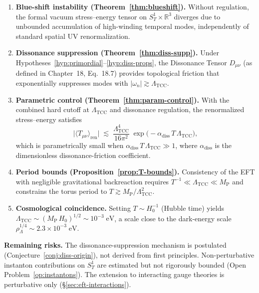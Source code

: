 \documentclass[12pt,openany]{book}
\theoremstyle{plain}
\theoremstyle{definition}
\theoremstyle{remark}
\providecommand{\Ltcc}{\Lambda_{\mathrm{TCC}}}
\providecommand{\Mpl}{M_{\mathrm{P}}}
\providecommand{\vev}[1]{\langle #1 \rangle}
\providecommand{\abs}[1]{\lvert #1 \rvert}
\providecommand{\Ren}{\mathrm{ren}}
\providecommand{\diss}{\mathrm{diss}}
\providecommand{\SoneR}{S^{1}_{T}\!\times\!\mathbb{R}^{3}}
\begin{document}
\begin{enumerate}
  \item \textbf{Blue-shift instability (Theorem~\ref{thm:blueshift}).}
    Without regulation, the formal vacuum stress--energy tensor on
    $\SoneR$ diverges due to unbounded accumulation of
    high-winding temporal modes, independently of standard spatial UV
    renormalization.

  \item \textbf{Dissonance suppression (Theorem~\ref{thm:diss-supp}).}
    Under Hypotheses~\ref{hyp:primordial}--\ref{hyp:diss-props},
    the Dissonance Tensor $D_{\mu\nu}$ (as defined in Chapter~18,
    Eq.~18.7) provides topological friction that exponentially suppresses
    modes with $\abs{\omega_n} \gtrsim \Ltcc$.

  \item \textbf{Parametric control (Theorem~\ref{thm:param-control}).}
    With the combined hard cutoff at $\Ltcc$ and dissonance regulation,
    the renormalized stress--energy satisfies
    \[
      \abs{\vev{T_{\mu\nu}}_{\Ren}} \;\lesssim\;
        \frac{\Ltcc^{4}}{16\pi^{2}}\;
        \exp\!\bigl(-\alpha_{\diss}\, T\,\Ltcc\bigr),
    \]
    which is parametrically small when
    $\alpha_{\diss}\, T\,\Ltcc \gg 1$, where $\alpha_{\diss}$ is
    the dimensionless dissonance-friction coefficient.

  \item \textbf{Period bounds (Proposition~\ref{prop:T-bounds}).}
    Consistency of the EFT with negligible gravitational backreaction
    requires
    $T^{-1} \ll \Ltcc \ll \Mpl$
    and constrains the torus period to
    $T \gtrsim \Mpl / \Ltcc^{2}$.

  \item \textbf{Cosmological coincidence.}
    Setting $T \sim H_{0}^{-1}$ (Hubble time) yields
    $\Ltcc \sim (\Mpl\, H_{0})^{1/2} \sim 10^{-3}\;\mathrm{eV}$,
    a scale close to the dark-energy scale
    $\rho_{\Lambda}^{1/4} \sim 2.3 \times 10^{-3}\;\mathrm{eV}$.
\end{enumerate}

\noindent\textbf{Remaining risks.}
The dissonance-suppression mechanism is postulated
(Conjecture~\ref{conj:diss-origin}), not derived from first principles.
Non-perturbative instanton contributions on $S^{1}_{T}$ are estimated
but not rigorously bounded (Open Problem~\ref{op:instantons}).
The extension to interacting gauge theories is perturbative only
(\S\ref{sec:eft-interactions}).


\end{document}
